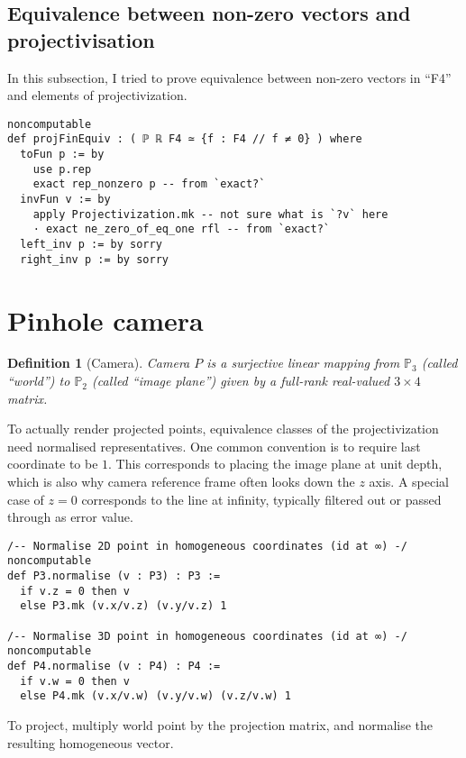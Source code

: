 \documentclass[a4paper, 12pt]{article}
\newtheorem{definition}{Definition}
\renewcommand{\P}{\mathbb{P}}
\begin{document}
\subsection*{Equivalence between non-zero vectors and projectivisation}

In this subsection, I tried to prove equivalence between
non-zero vectors in ``F4'' and elements of projectivization.

\begin{lstlisting}
noncomputable
def projFinEquiv : ( ℙ ℝ F4 ≃ {f : F4 // f ≠ 0} ) where
  toFun p := by
    use p.rep
    exact rep_nonzero p -- from `exact?`
  invFun v := by
    apply Projectivization.mk -- not sure what is `?v` here
    · exact ne_zero_of_eq_one rfl -- from `exact?`
  left_inv p := by sorry
  right_inv p := by sorry
\end{lstlisting}

\section*{Pinhole camera}

\begin{definition}[Camera]
  Camera $P$ is a surjective linear mapping
  from $\P_3$ (called ``world'') to $\P_2$ (called ``image plane'')
  given by a full-rank real-valued $3\times 4$ matrix.
\end{definition}

To actually render projected points,
equivalence classes of the projectivization need normalised representatives.
One common convention is to require last coordinate to be $1$.
This corresponds to placing the image plane at unit depth,
which is also why camera reference frame often looks down the $z$ axis.
A special case of $z=0$ corresponds to the line at infinity,
typically filtered out or passed through as error value.

\begin{lstlisting}
/-- Normalise 2D point in homogeneous coordinates (id at ∞) -/
noncomputable
def P3.normalise (v : P3) : P3 :=
  if v.z = 0 then v
  else P3.mk (v.x/v.z) (v.y/v.z) 1

/-- Normalise 3D point in homogeneous coordinates (id at ∞) -/
noncomputable
def P4.normalise (v : P4) : P4 :=
  if v.w = 0 then v
  else P4.mk (v.x/v.w) (v.y/v.w) (v.z/v.w) 1
\end{lstlisting}

To project, multiply world point by the projection matrix,
and normalise the resulting homogeneous vector.
\end{document}
